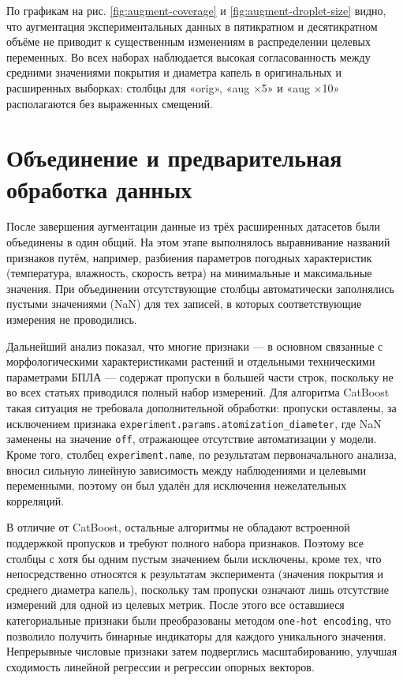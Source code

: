 

\newpage

По графикам на рис. \ref{fig:augment-coverage} и \ref{fig:augment-droplet-size} видно, что аугментация экспериментальных данных в пятикратном и десятикратном объёме не приводит к существенным изменениям в распределении целевых переменных. Во всех наборах наблюдается высокая согласованность между средними значениями покрытия и диаметра капель в оригинальных и расширенных выборках: столбцы для «orig», «aug ×5» и «aug ×10» располагаются без выраженных смещений.

\section{Объединение и предварительная обработка данных} \label{ch2:proccessed}

После завершения аугментации данные из трёх расширенных датасетов были объединены в один общий. На этом этапе выполнялось выравнивание названий признаков путём, например, разбиения параметров погодных характеристик (температура, влажность, скорость ветра) на минимальные и максимальные значения. При объединении отсутствующие столбцы автоматически заполнялись пустыми значениями (NaN) для тех записей, в которых соответствующие измерения не проводились.

Дальнейший анализ показал, что многие признаки --- в основном связанные с морфологическими характеристиками растений и отдельными техническими параметрами БПЛА --- содержат пропуски в большей части строк, поскольку не во всех статьях приводился полный набор измерений. Для алгоритма CatBoost такая ситуация не требовала дополнительной обработки: пропуски оставлены, за исключением признака \texttt{experiment.params.atomization\_diameter}, где NaN заменены на значение \texttt{off}, отражающее отсутствие автоматизации у модели. Кроме того, столбец \texttt{experiment.name}, по результатам первоначального анализа, вносил сильную линейную зависимость между наблюдениями и целевыми переменными, поэтому он был удалён для исключения нежелательных корреляций.

В отличие от CatBoost, остальные алгоритмы не обладают встроенной поддержкой пропусков и требуют полного набора признаков. Поэтому все столбцы с хотя бы одним пустым значением были исключены, кроме тех, что непосредственно относятся к результатам эксперимента (значения покрытия и среднего диаметра капель), поскольку там пропуски означают лишь отсутствие измерений для одной из целевых метрик. После этого все оставшиеся категориальные признаки были преобразованы методом \texttt{one-hot encoding}, что позволило получить бинарные индикаторы для каждого уникального значения. Непрерывные числовые признаки затем подверглись масштабированию, улучшая сходимость линейной регрессии и регрессии опорных векторов.

